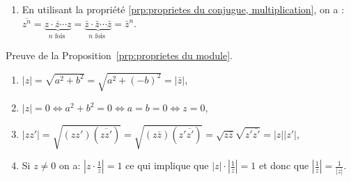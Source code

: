 \begin{corrige}
\begin{dem}
\begin{enumerate}
                  \begin{align*}
                        \frac{1}{z}
                              & =  {\frac{1}{a + i b}}                                          
                                =  {\frac{a - i b}{(a+ib)(a-ib)}}                               
                                =  {\frac{a}{a^2 + b^2} - i \frac{b}{a^2 + b^2}}                        \\
                        \intertext{ on a  }
                        \overline{\frac{1}{z}}
                              & = \frac{a}{a^2 + b^2} + i \frac{b}{a^2 + b^2}                           
                                = \frac{a + i b}{a^2 + b^2}                                             
                                = \frac{a+ib}{(a-ib)(a-ib)}                                             \\
                              & = \frac{1}{a-ib}                                                        
                                = \frac{1}{\bar{z}}                                                     \;.
                  \end{align*}
            \item En utilisant la propri\'et\'e \ref{prp:proprietes du conjugue, multiplication}, on a :
                  $\overline{z^n} = \overline{ \underbrace{z \cdot z \cdots z}_{n \text{ fois }} }
                        = \underbrace{ \bar{z} \cdot \bar{z} \cdots \bar{z} }_{n \text{ fois }} 
                        = {\bar{z}}^n$.
      \end{enumerate}
\end{dem}
\begin{dem}
	\label{dem:proprietes du module}
	Preuve de la Proposition~\ref{prp:proprietes du module}. 
	\begin{enumerate}
	      \item $|z| = \sqrt{a^2 + b^2} = \sqrt{a^2 + (-b)^2} = |\bar{z}|$,
	      \item $|z| = 0 \iff a^2 + b^2 = 0 \iff a = b = 0 \iff z = 0$,
	      \item $|z z'| = \sqrt{(zz') (\overline{zz'})} = \sqrt{(z \bar{z}) (z' \overline{z'})} 
	            = \sqrt{z \bar{z}} \sqrt{z' \overline{z'}} = |z| |z'| $,
	      \item Si $z \neq 0$ on a: $|z \cdot \frac{1}{z}| = 1$ ce qui implique que 
	            $|z| \cdot |\frac{1}{z}| = 1$ et donc que $|\frac{1}{z}| = \frac{1}{|z|}$.

\end{enumerate}
\end{dem}
\end{corrige}

